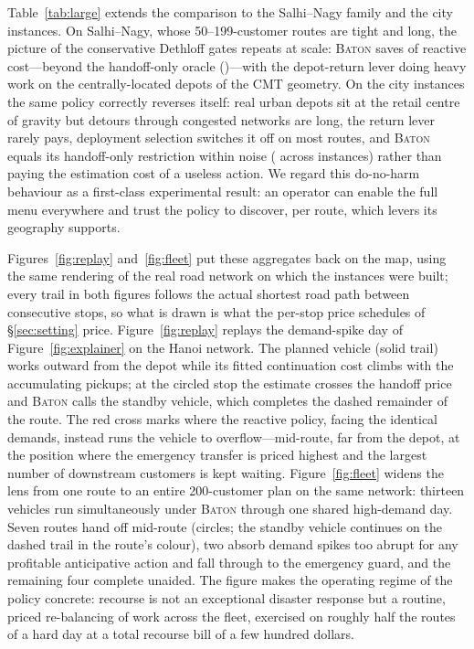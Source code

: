 \documentclass[preprint,authoryear,12pt]{elsarticle}
\theoremstyle{definition}
\theoremstyle{remark}
\begin{document}
Table~\ref{tab:large} extends the comparison to the Salhi--Nagy family
and the city instances. On Salhi--Nagy, whose 50--199-customer routes
are tight and long, the picture of the conservative Dethloff gates
repeats at scale: \textsc{Baton} saves \svSalhiBaton{} of reactive
cost---beyond the handoff-only oracle (\svSalhiOrc{})---with the
depot-return lever doing heavy work on the centrally-located depots of
the CMT geometry. On the city instances the same policy correctly
reverses itself: real urban depots sit at the retail centre of gravity
but detours through congested networks are long, the return lever
rarely pays, deployment selection switches it off on most routes, and
\textsc{Baton} equals its handoff-only restriction within noise
(\svCityBaton{} across \nCity{} instances) rather than paying the
estimation cost of a useless action. We regard this
do-no-harm behaviour as a first-class experimental result: an
operator can enable the full menu everywhere and trust the policy to
discover, per route, which levers its geography supports.



Figures~\ref{fig:replay} and~\ref{fig:fleet} put these aggregates back
on the map, using the same rendering of the real road network on which
the instances were built; every trail in both figures follows the actual
shortest road path between consecutive stops, so what is drawn is what
the per-stop price schedules of \S\ref{sec:setting} price.
Figure~\ref{fig:replay} replays the demand-spike day of
Figure~\ref{fig:explainer} on the Hanoi network. The planned vehicle
(solid trail) works outward from the depot while its fitted continuation
cost climbs with the accumulating pickups; at the circled stop the
estimate crosses the handoff price and \textsc{Baton} calls the standby
vehicle, which completes the dashed remainder of the route. The red
cross marks where the reactive policy, facing the identical demands,
instead runs the vehicle to overflow---mid-route, far from the depot,
at the position where the emergency transfer is priced highest and the
largest number of downstream customers is kept waiting.
Figure~\ref{fig:fleet} widens the lens from one route to an entire
200-customer plan on the same network: thirteen vehicles run
simultaneously under \textsc{Baton} through one shared high-demand day.
Seven routes hand off mid-route (circles; the standby vehicle continues
on the dashed trail in the route's colour), two absorb demand spikes
too abrupt for any profitable anticipative action and fall through to
the emergency guard, and the remaining four complete unaided. The
figure makes the operating regime of the policy concrete: recourse is
not an exceptional disaster response but a routine, priced re-balancing
of work across the fleet, exercised on roughly half the routes of a
hard day at a total recourse bill of a few hundred dollars.
\end{document}
